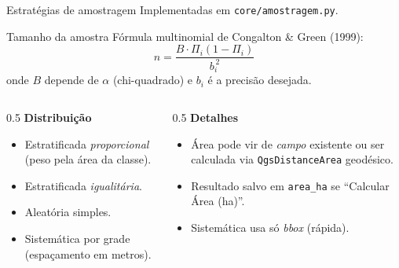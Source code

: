 \documentclass[10pt,aspectratio=169]{beamer}
\begin{document}
\begin{frame}{Estratégias de amostragem}
  Implementadas em \texttt{core/amostragem.py}.
  \begin{block}{Tamanho da amostra}
    Fórmula multinomial de Congalton \& Green (1999):
    \[
      n = \frac{B \cdot \Pi_i (1-\Pi_i)}{b_i^{\,2}}
    \]
    onde $B$ depende de $\alpha$ (chi-quadrado) e $b_i$ é a precisão desejada.
  \end{block}
  \begin{columns}[T,onlytextwidth]
    \begin{column}{0.5\textwidth}
      \textbf{Distribuição}
      \begin{itemize}
        \item Estratificada \emph{proporcional} (peso pela área da classe).
        \item Estratificada \emph{igualitária}.
        \item Aleatória simples.
        \item Sistemática por grade (espaçamento em metros).
      \end{itemize}
    \end{column}
    \begin{column}{0.5\textwidth}
      \textbf{Detalhes}
      \begin{itemize}
        \item Área pode vir de \emph{campo} existente ou ser calculada via \texttt{QgsDistanceArea} geodésico.
        \item Resultado salvo em \texttt{area\_ha} se ``Calcular Área (ha)''.
        \item Sistemática usa só \emph{bbox} (rápida).
      \end{itemize}
    \end{column}
  \end{columns}
\end{frame}
\end{document}
